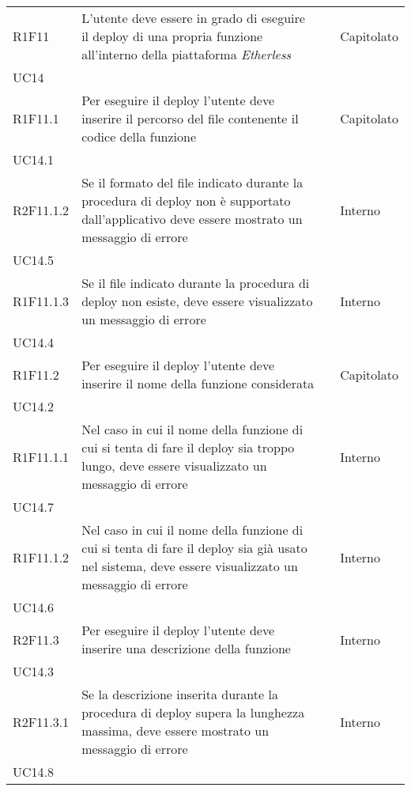 \begin{longtable}{ 
		>{\centering}p{} 
		>{}p{} 
		>{\centering}p{}
		>{\centering}p{} }
	R1F11 & L'utente deve essere in grado di eseguire il deploy di una propria
		funzione all'interno della piattaforma \textit{Etherless} 					& \ob & Capitolato \\ UC14 \tabularnewline
	R1F11.1 & Per eseguire il deploy l'utente deve inserire il percorso del file 
		contenente il codice della funzione 										& \ob & Capitolato \\ UC14.1 \tabularnewline
	R2F11.1.2 & Se il formato del file indicato durante la procedura di deploy
		non è supportato dall'applicativo deve essere mostrato un messaggio di 
		errore																		& \de & Interno \\ UC14.5 \tabularnewline
	R1F11.1.3 & Se il file indicato durante la procedura di deploy non esiste, 
		deve essere visualizzato un messaggio di errore								& \ob & Interno \\ UC14.4 \tabularnewline
	R1F11.2 & Per eseguire il deploy l'utente deve inserire il nome della 
		funzione considerata 														& \ob & Capitolato \\ UC14.2 \tabularnewline
	R1F11.1.1 & Nel caso in cui il nome della funzione di cui si tenta di fare 
		il deploy sia troppo lungo, deve essere visualizzato un messaggio di errore & \ob & Interno \\ UC14.7 \tabularnewline
	R1F11.1.2 & Nel caso in cui il nome della funzione di cui si tenta di fare 
		il deploy sia già usato nel sistema, deve essere visualizzato un messaggio 
		di errore																	& \ob & Interno \\ UC14.6 \tabularnewline
	R2F11.3 & Per eseguire il deploy l'utente deve inserire una descrizione 
		della funzione 																& \de & Interno \\ UC14.3  \tabularnewline
	R2F11.3.1 & Se la descrizione inserita durante la procedura di deploy supera la 
		lunghezza massima, deve essere mostrato un messaggio di errore 				& \de & Interno \\ UC14.8  \tabularnewline
	

\end{longtable}
